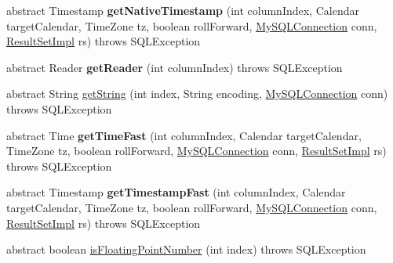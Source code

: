 \begin{DoxyCompactItemize}
\item 
\mbox{\label{classcom_1_1mysql_1_1jdbc_1_1_result_set_row_a8890a9c93f4b3314ba98348b9254e372}} 
abstract Timestamp {\bfseries get\+Native\+Timestamp} (int column\+Index, Calendar target\+Calendar, Time\+Zone tz, boolean roll\+Forward, \mbox{\hyperlink{interfacecom_1_1mysql_1_1jdbc_1_1_my_s_q_l_connection}{My\+S\+Q\+L\+Connection}} conn, \mbox{\hyperlink{classcom_1_1mysql_1_1jdbc_1_1_result_set_impl}{Result\+Set\+Impl}} rs)  throws S\+Q\+L\+Exception
\item 
\mbox{\label{classcom_1_1mysql_1_1jdbc_1_1_result_set_row_a4becfbce9fd8fd07f702b653f830d2d0}} 
abstract Reader {\bfseries get\+Reader} (int column\+Index)  throws S\+Q\+L\+Exception
\item 
abstract String \mbox{\hyperlink{classcom_1_1mysql_1_1jdbc_1_1_result_set_row_af2c2012bd344ef5efe874ea994431f65}{get\+String}} (int index, String encoding, \mbox{\hyperlink{interfacecom_1_1mysql_1_1jdbc_1_1_my_s_q_l_connection}{My\+S\+Q\+L\+Connection}} conn)  throws S\+Q\+L\+Exception
\item 
\mbox{\label{classcom_1_1mysql_1_1jdbc_1_1_result_set_row_a6a5a55e329b929a24c66e670204160f2}} 
abstract Time {\bfseries get\+Time\+Fast} (int column\+Index, Calendar target\+Calendar, Time\+Zone tz, boolean roll\+Forward, \mbox{\hyperlink{interfacecom_1_1mysql_1_1jdbc_1_1_my_s_q_l_connection}{My\+S\+Q\+L\+Connection}} conn, \mbox{\hyperlink{classcom_1_1mysql_1_1jdbc_1_1_result_set_impl}{Result\+Set\+Impl}} rs)  throws S\+Q\+L\+Exception
\item 
\mbox{\label{classcom_1_1mysql_1_1jdbc_1_1_result_set_row_a7f6a2c12bba0877de6c266a24c79c29a}} 
abstract Timestamp {\bfseries get\+Timestamp\+Fast} (int column\+Index, Calendar target\+Calendar, Time\+Zone tz, boolean roll\+Forward, \mbox{\hyperlink{interfacecom_1_1mysql_1_1jdbc_1_1_my_s_q_l_connection}{My\+S\+Q\+L\+Connection}} conn, \mbox{\hyperlink{classcom_1_1mysql_1_1jdbc_1_1_result_set_impl}{Result\+Set\+Impl}} rs)  throws S\+Q\+L\+Exception
\item 
abstract boolean \mbox{\hyperlink{classcom_1_1mysql_1_1jdbc_1_1_result_set_row_abce23203c5142ca0ed2a8f0d031c8123}{is\+Floating\+Point\+Number}} (int index)  throws S\+Q\+L\+Exception

\end{DoxyCompactItemize}
